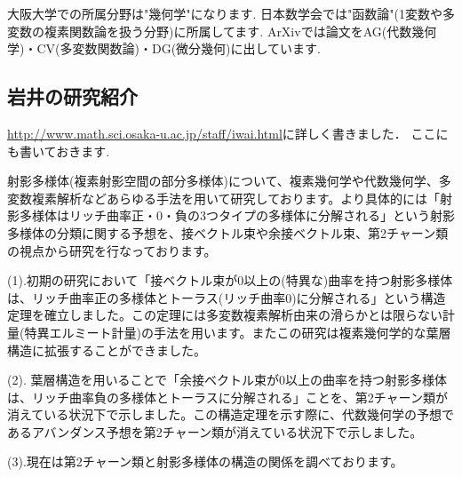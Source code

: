 大阪大学での所属分野は"幾何学"になります. 日本数学会では"函数論"(1変数や多変数の複素関数論を扱う分野)に所属してます. ArXivでは論文をAG(代数幾何学)・CV(多変数関数論)・DG(微分幾何)に出しています. 

\subsection{岩井の研究紹介}
\url{http://www.math.sci.osaka-u.ac.jp/staff/iwai.html}に詳しく書きました．
ここにも書いておきます. 

\begin{tcolorbox}[mybox]

\hspace{12pt}射影多様体(複素射影空間の部分多様体)について、複素幾何学や代数幾何学、多変数複素解析などあらゆる手法を用いて研究しております。より具体的には「射影多様体はリッチ曲率正・0・負の3つタイプの多様体に分解される」という射影多様体の分類に関する予想を、接ベクトル束や余接ベクトル束、第2チャーン類の視点から研究を行なっております。
\vspace{5pt}

(1).初期の研究において「接ベクトル束が0以上の(特異な)曲率を持つ射影多様体は、リッチ曲率正の多様体とトーラス(リッチ曲率0)に分解される」という構造定理を確立しました。この定理には多変数複素解析由来の滑らかとは限らない計量(特異エルミート計量)の手法を用います。またこの研究は複素幾何学的な葉層構造に拡張することができました。
\vspace{5pt}

(2). 葉層構造を用いることで「余接ベクトル束が0以上の曲率を持つ射影多様体は、リッチ曲率負の多様体とトーラスに分解される」ことを、第2チャーン類が消えている状況下で示しました。この構造定理を示す際に、代数幾何学の予想であるアバンダンス予想を第2チャーン類が消えている状況下で示しました。
\vspace{5pt}

(3).現在は第2チャーン類と射影多様体の構造の関係を調べております。
\end{tcolorbox}

